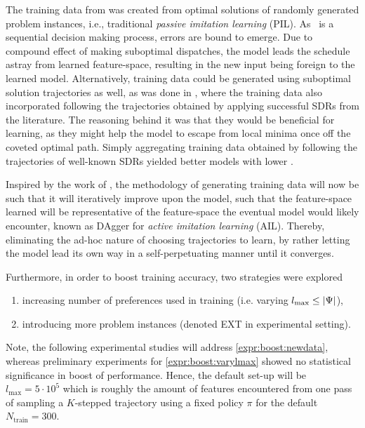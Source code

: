 \documentclass[twocolumn]{svjour3}
\begin{document}
The training data from \cite{InRu11a} was created from optimal solutions of 
randomly generated problem instances, i.e., traditional \emph{passive
imitation learning} (PIL). 
As \JSP\ is a sequential decision making process, errors are bound to emerge. 
Due to compound effect of making suboptimal dispatches, the model leads the 
schedule astray from learned feature-space, resulting in the new input being 
foreign to the learned model. 
Alternatively, training data could be generated using suboptimal solution 
trajectories as well, as was done in \cite{InRu15a}, where the training data 
also incorporated following the trajectories obtained by applying successful 
SDRs from the literature. 
The reasoning behind it was that they would be beneficial for learning, 
as they might help the model to escape from local minima once off the coveted 
optimal path. 
Simply aggregating training data obtained by following the trajectories of 
well-known SDRs yielded better models with lower \namerho. 

Inspired by the work of \cite{RossB10,RossGB11}, the methodology of generating 
training data will now be such that it will iteratively improve upon the model, 
such that the feature-space learned will be representative of the feature-space 
the eventual model would likely encounter, known as DAgger for \emph{active 
imitation learning} (AIL).
Thereby, eliminating the ad-hoc nature of choosing trajectories to learn, by 
rather letting the model lead its own way in a self-perpetuating manner until 
it converges.

Furthermore, in order to boost training accuracy, two strategies were explored 
\begin{enumerate}[after={{}}, leftmargin=*,
label={\textbf{Boost.\arabic*}}, ref={{Boost.\arabic*}}]
\item \label{expr:boost:varylmax} increasing number of preferences used 
in training (i.e. varying \mbox{$l_{\max} \leq \lvert\Psi\rvert$}),
\item \label{expr:boost:newdata} introducing more problem instances (denoted 
EXT in experimental setting).
\end{enumerate}
Note, the following experimental studies will address 
\ref{expr:boost:newdata}, whereas preliminary experiments for 
\ref{expr:boost:varylmax} showed no statistical significance in boost of 
performance. Hence, the default set-up will be $l_{\max}=5 \cdot 10^5$ which is 
roughly the amount of features encountered from one pass of sampling a 
\mbox{$K$-stepped} trajectory using a fixed policy $\pi$ for the default 
$N_{\text{train}}=300$. 
\end{document}
